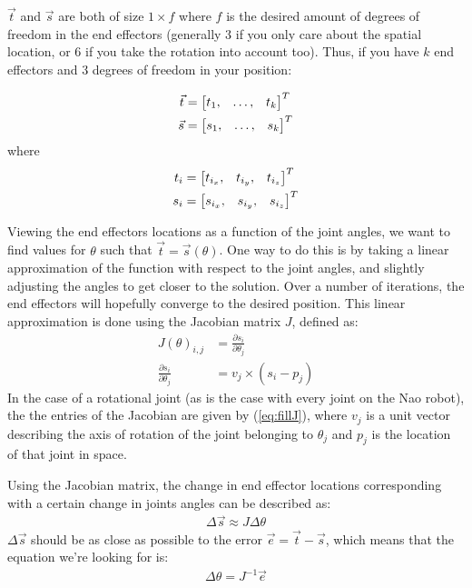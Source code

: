 \documentclass[a4paper]{article}
\begin{document}
$\vec{t}$ and $\vec{s}$ are both of size $1 \times f$ where $f$ is the
desired amount of degrees of freedom in the end effectors (generally 3
if you only care about the spatial location, or 6 if you take the
rotation into account too).  Thus, if you have $k$ end effectors and 3
degrees of freedom in your position:

\begin{align*}
    \vec{t} &= \begin{bmatrix} t_1, &\dots, &t_k \end{bmatrix}^T \\
    \vec{s} &= \begin{bmatrix} s_1, &\dots, &s_k \end{bmatrix}^T
\end{align*}
where
\begin{align*}
    t_i &= \begin{bmatrix} t_{i_{x}}, &t_{i_{y}}, &t_{i_{z}} \end{bmatrix}^T \\
    s_i &= \begin{bmatrix} s_{i_{x}}, &s_{i_{y}}, &s_{i_{z}} \end{bmatrix}^T
\end{align*}

Viewing the end effectors locations as a function of the joint angles,
we want to find values for $\theta$ such that $\vec{t} =
\vec{s}(\theta)$. One way to do this is by taking a linear
approximation of the function with respect to the joint angles, and
slightly adjusting the angles to get closer to the solution.  Over a
number of iterations, the end effectors will hopefully converge to the
desired position.  This linear approximation is done using the
Jacobian matrix $J$, defined as:
\begin{align}
  J(\theta)_{i, j} &= \frac{\partial s_i}{\partial \theta_j} \\
  \frac{\partial s_i}{\partial \theta_j} &= v_j \times (s_i - p_j)    \label{eq:fillJ}
\end{align}
In the case of a rotational joint (as is the case with every joint on
the Nao robot), the the entries of the Jacobian are given by
(\ref{eq:fillJ}), where $v_j$ is a unit vector describing the axis of
rotation of the joint belonging to $\theta_j$ and $p_j$ is the
location of that joint in space.

Using the Jacobian matrix, the change in end effector locations
corresponding with a certain change in joints angles can be described
as:
\begin{align*}
  \Delta \vec{s} \approx J \Delta \theta
\end{align*}
$\Delta \vec{s}$ should be as close as possible to the error $\vec{e}
= \vec{t} - \vec{s}$, which means that the equation
we're looking for is:
\begin{align*}
  \Delta \theta = J^{-1} \vec{e}
\end{align*}
\end{document}
